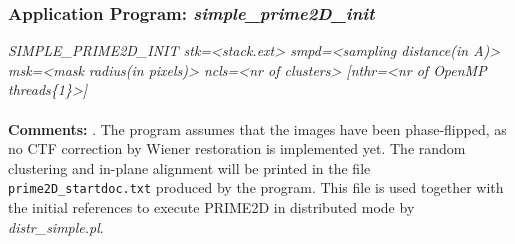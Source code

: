 \documentclass[review]{elsarticle}
\begin{document}
{{\subsubsection{Application Program: {\it{simple\_prime2D\_init}}}
\label{prime2D_init}
{\it{SIMPLE\_PRIME2D\_INIT stk=<stack.ext> smpd=<sampling distance(in A)> msk=<mask}}
{\it{radius(in pixels)> ncls=<nr of clusters> [nthr=<nr of OpenMP threads\{1\}>]}}
\\\\
\noindent\textbf{Comments:} . The program assumes that the images have been phase-flipped, as no CTF correction by Wiener restoration is implemented yet. The random clustering and in-plane alignment will be printed in the file \texttt{prime2D\_startdoc.txt} produced by the program. This file is used together with the initial references to execute PRIME2D in distributed mode by {\it{distr\_simple.pl}}.

}}
\end{document}
